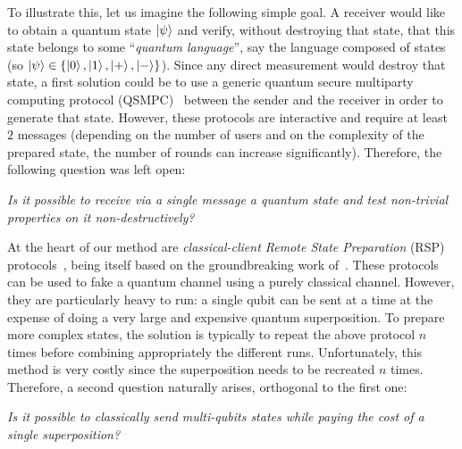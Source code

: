 To illustrate this, let us imagine the following simple goal. A receiver would like to obtain a quantum state $\ket{\psi}$ and verify, without destroying that state, that this state belongs to some ``\emph{quantum language}'', say the language composed of \BBHeightyFor{} states (so $\ket{\psi} \in \{\ket{0},\ket{1},\ket{+},\ket{-}\}$). Since any direct measurement would destroy that state, a first solution could be to use a generic quantum secure multiparty computing protocol  (QSMPC)~\cite{DNS12_ActivelySecureTwoParty,DGJ+20_SecureMultipartyQuantum,KKMO21_DelegatingMultiPartyQuantum} between the sender and the receiver in order to generate that state. However, these protocols are interactive and require at least $2$ messages (depending on the number of users and on the complexity of the prepared state, the number of rounds can increase significantly). Therefore, the following question was left open:
\begin{center}
  \emph{Is it possible to receive via a single message a quantum state and test non-trivial properties on it non-destructively?}
\end{center}

At the heart of our method are \emph{classical-client Remote State Preparation} (RSP) protocols~\cite{CCKW18,CCKW_2019_qfactory,GV19_ComputationallySecureComposableRemote}, \cite{GV19_ComputationallySecureComposableRemote} being itself based on the groundbreaking work of~\cite{mahadev2017classical}. These protocols can be used to fake a quantum channel using a purely classical channel. However, they are particularly heavy to run: a single qubit can be sent at a time at the expense of doing a very large and expensive quantum superposition. To prepare more complex states, the solution is typically to repeat the above protocol $n$ times before combining appropriately the different runs. Unfortunately, this method is very costly since the superposition needs to be recreated $n$ times. Therefore, a second question naturally arises, orthogonal to the first one:
\begin{center}
  \emph{Is it possible to classically send multi-qubits states while paying the cost of a single superposition?}
\end{center}

